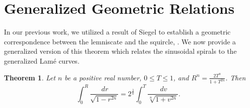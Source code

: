 \documentclass{amsart}
\newtheorem{theorem}{Theorem}
\theoremstyle{definition}
\begin{document}
\bigskip


\section{Generalized Geometric Relations}

In our previous work, we utilized a result of Siegel to establish a geometric correspondence between the lemniscate and the squircle,
\cite[Theorem 10]{Fiedorowicz-Ramalingam}. We now provide a generalized version of this theorem which relates the sinusoidal spirals to the generalized Lam\'e curves.

\begin{theorem}\label{siegel_relation}
Let $n$ be a positive real number, $0\le T\le1$, and $R^n=\frac{2T^n}{1+T^{2n}}$. Then
\begin{equation}\label{siegel_eqn}
\int_0^R\frac{\,dr}{\sqrt{1-r^{2n}}}=2^{\frac{1}{n}}\int_0^T\frac{\,dv}{\sqrt[n]{1+v^{2n}}}.
\end{equation}
\end{theorem}
\end{document}
